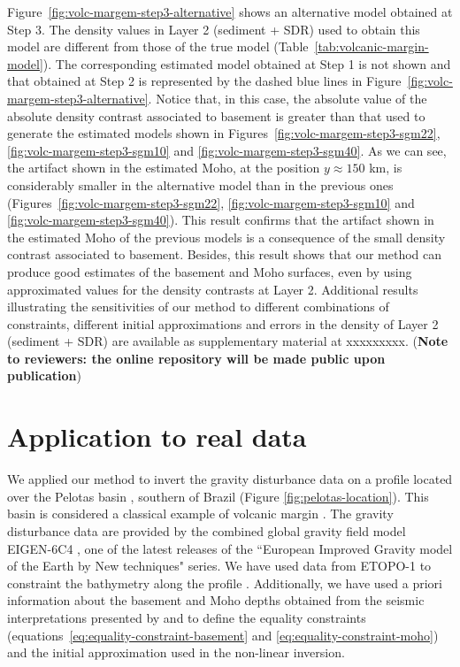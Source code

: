 \documentclass[manuscript]{geophysics}
\begin{document}
Figure~\ref{fig:volc-margem-step3-alternative} shows an alternative 
model obtained at Step 3.
The density values in Layer 2 (sediment + SDR) used to obtain this model 
are different from those of the true model (Table~\ref{tab:volcanic-margin-model}).
The corresponding estimated model obtained at Step 1 is not shown and
that obtained at Step 2 is represented by the dashed blue lines in
Figure~\ref{fig:volc-margem-step3-alternative}.
Notice that, in this case, the absolute value of the absolute density contrast associated to basement 
is greater than that used to generate the estimated models shown in 
Figures~\ref{fig:volc-margem-step3-sgm22}, \ref{fig:volc-margem-step3-sgm10} and
\ref{fig:volc-margem-step3-sgm40}. As we can see, the artifact shown in the estimated Moho,
at the position $y \approx 150$ km, is considerably smaller in the alternative model than
in the previous ones (Figures~\ref{fig:volc-margem-step3-sgm22}, \ref{fig:volc-margem-step3-sgm10} and
\ref{fig:volc-margem-step3-sgm40}). This result confirms that the artifact shown in the
estimated Moho of the previous models is a consequence of the small density contrast
associated to basement.
Besides, this result shows that our method can produce good estimates of the basement and
Moho surfaces, even by using approximated values for the density contrasts at Layer 2.
Additional results illustrating the sensitivities of our method to different combinations 
of constraints, different initial approximations and errors in the density of Layer 2 
(sediment + SDR) are available as supplementary material at xxxxxxxxx.
(\textbf{Note to reviewers: the online repository 
will be made public upon
publication})


\section{Application to real data}

We applied our method to invert the gravity disturbance data 
on a profile located over the Pelotas basin
\citep{stica-etal2014}, southern of Brazil (Figure \ref{fig:pelotas-location}). This basin is 
considered a classical example of volcanic margin \citep{geoffroy2005}.
The gravity disturbance data are provided by the combined global gravity field model EIGEN-6C4
\citep{forste2014}, one of the latest releases of the ``European Improved Gravity model of 
the Earth by New techniques" series.
We have used data from ETOPO-1 to constraint the bathymetry along the profile
\citep{amante-eakins2009}.
Additionally, we have used a priori information about the basement and Moho depths
obtained from the seismic interpretations presented by \citet{stica-etal2014} and
\citet{zalan2015} to define the equality constraints 
(equations~\ref{eq:equality-constraint-basement} and \ref{eq:equality-constraint-moho})
and the initial approximation used in the non-linear inversion. 
\end{document}
